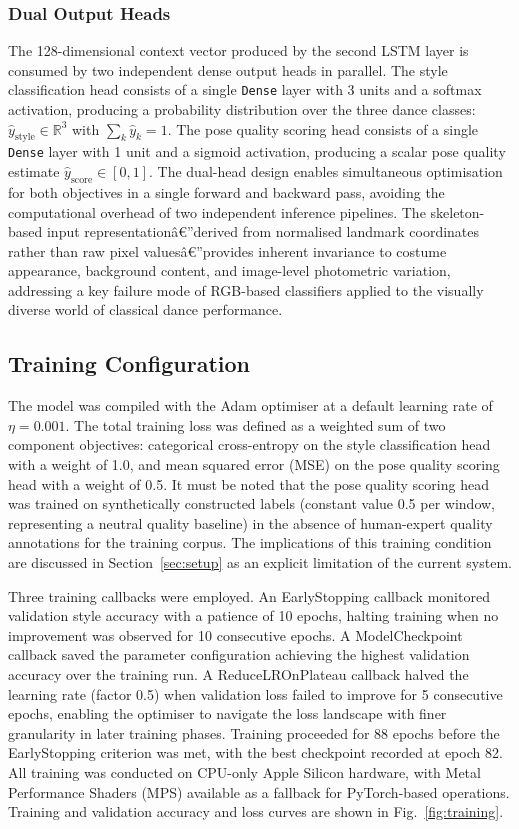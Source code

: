 \documentclass[journal]{IEEEtran}
\begin{document}
\subsubsection{Dual Output Heads}

The 128-dimensional context vector produced by the second LSTM layer
is consumed by two independent dense output heads in parallel.
The style classification head consists of a single \texttt{Dense}
layer with 3 units and a softmax activation, producing a probability
distribution over the three dance classes:
$\hat{y}_\text{style} \in \mathbb{R}^3$ with
$\sum_k \hat{y}_k = 1$. The pose quality scoring head consists of
a single \texttt{Dense} layer with 1 unit and a sigmoid activation,
producing a scalar pose quality estimate $\hat{y}_\text{score}
\in [0, 1]$. The dual-head design enables simultaneous optimisation
for both objectives in a single forward and backward pass, avoiding
the computational overhead of two independent inference pipelines.
The skeleton-based input representationâ€”derived from normalised
landmark coordinates rather than raw pixel valuesâ€”provides inherent
invariance to costume appearance, background content, and image-level
photometric variation, addressing a key failure mode of RGB-based
classifiers applied to the visually diverse world of classical
dance performance.

\subsection{Training Configuration}

The model was compiled with the Adam optimiser at a default learning
rate of $\eta = 0.001$. The total training loss was defined as a
weighted sum of two component objectives: categorical cross-entropy
on the style classification head with a weight of 1.0, and mean
squared error (MSE) on the pose quality scoring head with a weight
of 0.5. It must be noted that the pose quality scoring head was
trained on synthetically constructed labels (constant value 0.5 per
window, representing a neutral quality baseline) in the absence of
human-expert quality annotations for the training corpus. The
implications of this training condition are discussed in
Section~\ref{sec:setup} as an explicit limitation of the current
system.

Three training callbacks were employed. An EarlyStopping callback
monitored validation style accuracy with a patience of 10 epochs,
halting training when no improvement was observed for 10 consecutive
epochs. A ModelCheckpoint callback saved the parameter configuration
achieving the highest validation accuracy over the training run.
A ReduceLROnPlateau callback halved the learning rate (factor 0.5)
when validation loss failed to improve for 5 consecutive epochs,
enabling the optimiser to navigate the loss landscape with finer
granularity in later training phases. Training proceeded for 88 epochs
before the EarlyStopping criterion was met, with the best checkpoint
recorded at epoch 82. All training was conducted on CPU-only
Apple Silicon hardware, with Metal Performance Shaders (MPS) available
as a fallback for PyTorch-based operations. Training and validation
accuracy and loss curves are shown in Fig.~\ref{fig:training}.
\end{document}
